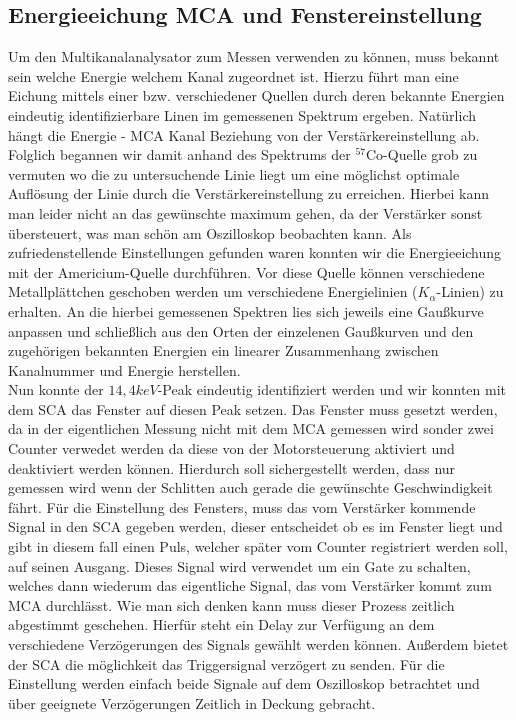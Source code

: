 \documentclass[12pt]{article}
\begin{document}
\subsection{Energieeichung MCA und Fenstereinstellung}
Um den Multikanalanalysator zum Messen verwenden zu können, muss bekannt sein welche Energie welchem Kanal zugeordnet ist. Hierzu führt man eine Eichung mittels einer bzw. verschiedener
Quellen durch deren bekannte Energien eindeutig identifizierbare Linen im gemessenen Spektrum ergeben. Natürlich hängt die Energie - MCA Kanal Beziehung von der Verstärkereinstellung ab.
Folglich begannen wir damit anhand des Spektrums der $^{57}$Co-Quelle grob zu vermuten wo die zu untersuchende Linie liegt um eine möglichst optimale Auflösung der Linie durch die
Verstärkereinstellung zu erreichen. Hierbei kann man leider nicht an das gewünschte maximum gehen, da der Verstärker sonst übersteuert, was man schön am Oszilloskop beobachten kann.
Als zufriedenstellende Einstellungen gefunden waren konnten wir die Energieeichung mit der Americium-Quelle durchführen. Vor diese Quelle können verschiedene Metallplättchen geschoben
werden um verschiedene Energielinien ($K_\alpha$-Linien) zu erhalten. An die hierbei gemessenen Spektren lies sich jeweils eine Gaußkurve anpassen und schließlich aus den Orten der
einzelenen Gaußkurven und den zugehörigen bekannten Energien ein linearer Zusammenhang zwischen Kanalnummer und Energie herstellen.\\

Nun konnte der $14,4keV$-Peak eindeutig identifiziert werden und wir konnten mit dem SCA das Fenster auf diesen Peak setzen. Das Fenster muss gesetzt werden, da in der eigentlichen
Messung nicht mit dem MCA gemessen wird sonder zwei Counter verwedet werden da diese von der Motorsteuerung aktiviert und deaktiviert werden können. Hierdurch soll sichergestellt werden,
dass nur gemessen wird wenn der Schlitten auch gerade die gewünschte Geschwindigkeit fährt. Für die Einstellung des Fensters, muss das vom Verstärker kommende Signal in den SCA gegeben
werden, dieser entscheidet ob es im Fenster liegt und gibt in diesem fall einen Puls, welcher später vom Counter registriert werden soll, auf seinen Ausgang. Dieses Signal wird verwendet
um ein Gate zu schalten, welches dann wiederum das eigentliche Signal, das vom Verstärker kommt zum MCA durchlässt. Wie man sich denken kann muss dieser Prozess zeitlich abgestimmt
geschehen. Hierfür steht ein Delay zur Verfügung an dem verschiedene Verzögerungen des Signals gewählt werden können. Außerdem bietet der SCA die möglichkeit das Triggersignal verzögert
zu senden. Für die Einstellung werden einfach beide Signale auf dem Oszilloskop betrachtet und über geeignete Verzögerungen Zeitlich in Deckung gebracht.\\
\end{document}
